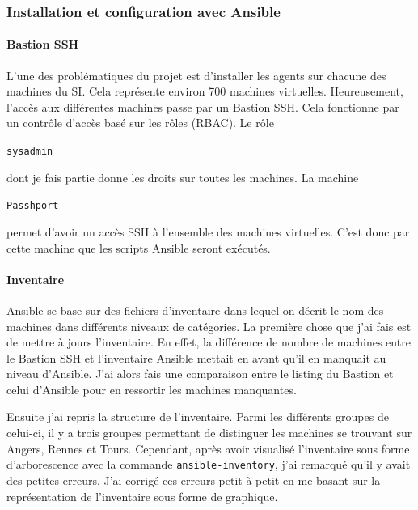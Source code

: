 \documentclass[12pt]{article}
\begin{document}
\subsubsection{Installation et configuration avec \gls{Ansible}}
\paragraph{Bastion SSH}
L'une des problématiques du projet est d'installer les agents sur chacune des machines du \gls{SI}. 
Cela représente environ 700 machines virtuelles. 
Heureusement, l'accès aux différentes machines passe par un Bastion SSH. 
Cela fonctionne par un contrôle d'accès basé sur les rôles (\gls{RBAC}). 
Le rôle \begin{code}\texttt{sysadmin}\end{code} dont je fais partie donne les droits sur toutes les machines. 
La machine \begin{code}\texttt{Passhport}\end{code} permet d'avoir un accès SSH à l'ensemble des machines virtuelles.
C'est donc par cette machine que les scripts \gls{Ansible} seront exécutés.

\paragraph{Inventaire}
\gls{Ansible} se base sur des fichiers d'inventaire dans lequel on décrit le nom des machines dans différents niveaux de catégories. 
La première chose que j'ai fais est de mettre à jours l'inventaire. 
En effet, la différence de nombre de machines entre le Bastion SSH et l'inventaire \gls{Ansible} mettait en avant qu'il en manquait au niveau d'\gls{Ansible}. 
J'ai alors fais une comparaison entre le listing du Bastion et celui d'\gls{Ansible} pour en ressortir les machines manquantes.

Ensuite j'ai repris la structure de l'inventaire. 
Parmi les différents groupes de celui-ci, il y a trois groupes permettant de distinguer les machines se trouvant sur Angers, Rennes et Tours. 
Cependant, après avoir visualisé l'inventaire sous forme d'arborescence avec la commande \verb|ansible-inventory|, j'ai remarqué qu'il y avait des petites erreurs. 
J'ai corrigé ces erreurs petit à petit en me basant sur la représentation de l'inventaire sous forme de graphique.
\end{document}
